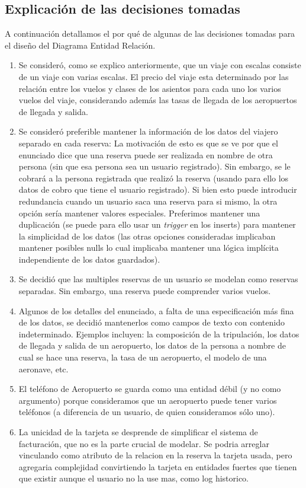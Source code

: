 \subsection{Explicaci\'on de las decisiones tomadas}

A continuaci\'on detallamos el por qu\'e de algunas de las decisiones tomadas para el diseño del Diagrama Entidad Relaci\'on.

\begin{enumerate}
	\item Se consider\'o, como se explico anteriormente, que un viaje con escalas consiste de un viaje con varias escalas. El
	precio del viaje esta determinado por las relaci\'on entre los vuelos y clases de los asientos para cada uno los varios 
	vuelos del viaje, considerando adem\'as las tasas de llegada de los aeropuertos de llegada y salida.
	\item Se consider\'o preferible mantener la informaci\'on de los datos del viajero separado en cada reserva: La motivaci\'on
	de esto es que se ve por que el enunciado dice que una reserva puede ser realizada en nombre de otra persona (sin que esa
	persona sea un usuario registrado). Sin embargo, se le cobrar\'a a la persona registrada que realiz\'o la reserva (usando
	para ello los datos de cobro que tiene el usuario registrado). Si bien esto puede introducir redundancia cuando un usuario
	saca una reserva para si mismo, la otra opci\'on ser\'ia mantener valores especiales. Preferimos mantener una duplicaci\'on
	(se puede para ello usar un \textit{trigger} en los inserts) para mantener la simplicidad de los datos (las otras opciones
	consideradas implicaban mantener posibles nulls lo cual implicaba mantener una l\'ogica impl\'icita independiente de los
	datos guardados).
	\item Se decidi\'o que las multiples reservas de un usuario se modelan como reservas separadas. Sin embargo, una reserva
	puede comprender varios vuelos.
	\item Algunos de los detalles del enunciado, a falta de una especificaci\'on m\'as fina de los datos, se decidi\'o mantenerlos
	como campos de texto con contenido indeterminado. Ejemplos incluyen: la composici\'on de la tripulaci\'on, los datos de llegada
	y salida de un aeropuerto, los datos de la persona a nombre de cual se hace una reserva, la tasa de un aeropuerto, el modelo
	de una aeronave, etc.
	\item El tel\'efono de Aeropuerto se guarda como una entidad d\'ebil (y no como argumento) porque consideramos que un aeropuerto puede tener varios tel\'efonos (a diferencia de un usuario, de quien consideramos s\'olo uno).
    \item La unicidad de la tarjeta se desprende de simplificar el sistema de facturaci\'on, que no es la parte crucial de
    modelar. Se podria arreglar vinculando como atributo de la relacion en la reserva la tarjeta usada, pero
    agregaria complejidad convirtiendo la tarjeta en entidades fuertes que tienen que existir aunque el usuario no la use mas,
    como log historico.
\end{enumerate}
